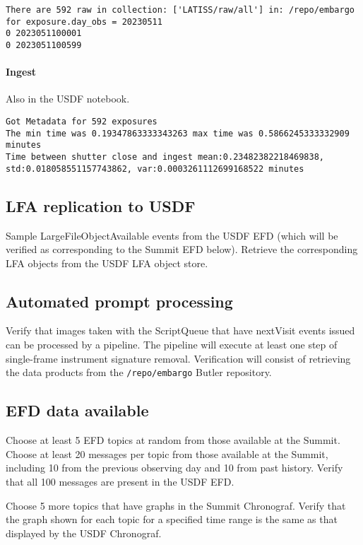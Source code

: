 \begin{verbatim}
There are 592 raw in collection: ['LATISS/raw/all'] in: /repo/embargo for exposure.day_obs = 20230511
0 2023051100001
0 2023051100599
\end{verbatim}

\paragraph {Ingest}
Also in the USDF notebook.
\begin{verbatim}
Got Metadata for 592 exposures
The min time was 0.19347863333343263 max time was 0.5866245333332909 minutes
Time between shutter close and ingest mean:0.23482382218469838, std:0.018058551157743862, var:0.0003261112699168522 minutes
\end{verbatim}

\subsection{LFA replication to USDF }
Sample LargeFileObjectAvailable events from the USDF EFD (which will be verified as corresponding to the Summit EFD below).
Retrieve the corresponding LFA objects from the USDF LFA object store.

\subsection{Automated prompt processing}
Verify that images taken with the ScriptQueue that have nextVisit events issued can be processed by a pipeline.
The pipeline will execute at least one step of single-frame instrument signature removal.
Verification will consist of retrieving the data products from the \texttt{/repo/embargo} Butler repository.

\subsection{EFD data available }
Choose at least 5 EFD topics at random from those available at the Summit.
Choose at least 20 messages per topic from those available at the Summit, including 10 from the previous observing day and 10 from past history.
Verify that all 100 messages are present in the USDF EFD.

Choose 5 more topics that have graphs in the Summit Chronograf.
Verify that the graph shown for each topic for a specified time range is the same as that displayed by the USDF Chronograf.
